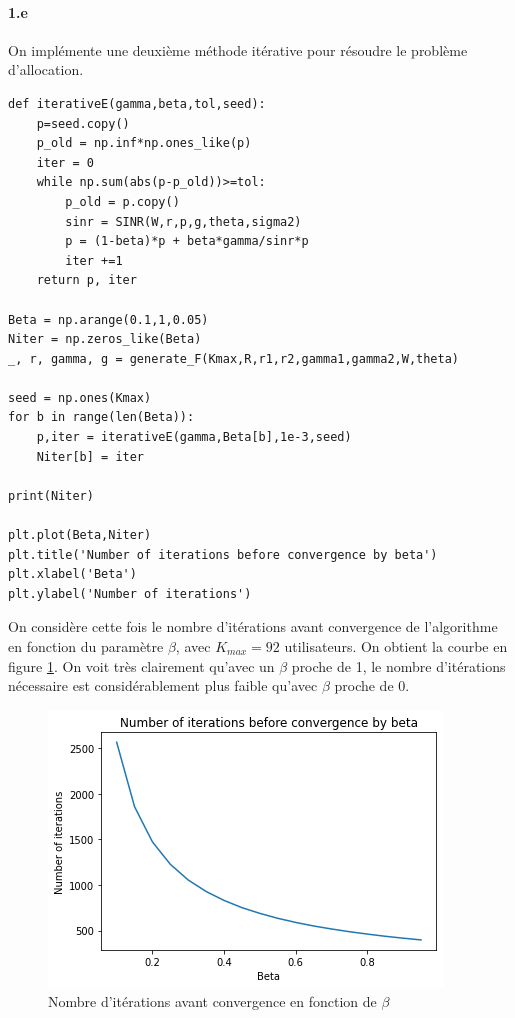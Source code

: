 \documentclass[a4paper,11pt,2]{article}
\begin{document}
\paragraph{1.e} On implémente une deuxième méthode itérative pour résoudre le problème d'allocation.
\begin{center}
\begin{lstlisting}
def iterativeE(gamma,beta,tol,seed):
    p=seed.copy()
    p_old = np.inf*np.ones_like(p)
    iter = 0
    while np.sum(abs(p-p_old))>=tol:
        p_old = p.copy()
        sinr = SINR(W,r,p,g,theta,sigma2)
        p = (1-beta)*p + beta*gamma/sinr*p
        iter +=1
    return p, iter

Beta = np.arange(0.1,1,0.05)
Niter = np.zeros_like(Beta)
_, r, gamma, g = generate_F(Kmax,R,r1,r2,gamma1,gamma2,W,theta)

seed = np.ones(Kmax)
for b in range(len(Beta)):
    p,iter = iterativeE(gamma,Beta[b],1e-3,seed)
    Niter[b] = iter

print(Niter)

plt.plot(Beta,Niter)
plt.title('Number of iterations before convergence by beta')
plt.xlabel('Beta')
plt.ylabel('Number of iterations')
\end{lstlisting}
\end{center}

On considère cette fois le nombre d'itérations avant convergence de l'algorithme en fonction du paramètre $\beta$, avec $K_{max}=92$ utilisateurs. On obtient la courbe en figure \ref{fig:II1e}. On voit très clairement qu'avec un $\beta$ proche de 1, le nombre d'itérations nécessaire est considérablement plus faible qu'avec $\beta$ proche de 0.

\begin{figure}[h]
\centering
\includegraphics[width=0.7\linewidth]{./Images/II-1e.png}
\caption{Nombre d'itérations avant convergence en fonction de $\beta$}
\label{fig:II1e}
\end{figure}
\end{document}
